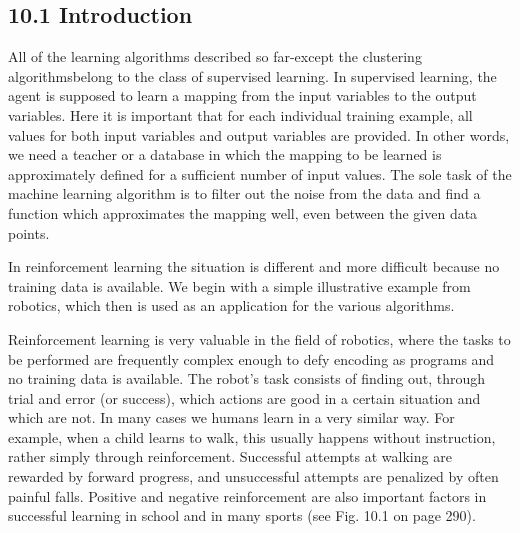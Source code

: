 \documentclass[10pt]{book}
\begin{document}
\begin{center}
\begin{enumerate}
\begin{center}
\begin{center}
\begin{center}
\subsection*{10.1 Introduction}
All of the learning algorithms described so far-except the clustering algorithmsbelong to the class of supervised learning. In supervised learning, the agent is supposed to learn a mapping from the input variables to the output variables. Here it is important that for each individual training example, all values for both input variables and output variables are provided. In other words, we need a teacher or a database in which the mapping to be learned is approximately defined for a sufficient number of input values. The sole task of the machine learning algorithm is to filter out the noise from the data and find a function which approximates the mapping well, even between the given data points.


In reinforcement learning the situation is different and more difficult because no training data is available. We begin with a simple illustrative example from robotics, which then is used as an application for the various algorithms.

Reinforcement learning is very valuable in the field of robotics, where the tasks to be performed are frequently complex enough to defy encoding as programs and no training data is available. The robot's task consists of finding out, through trial and error (or success), which actions are good in a certain situation and which are not. In many cases we humans learn in a very similar way. For example, when a child learns to walk, this usually happens without instruction, rather simply through reinforcement. Successful attempts at walking are rewarded by forward progress, and unsuccessful attempts are penalized by often painful falls. Positive and negative reinforcement are also important factors in successful learning in school and in many sports (see Fig. 10.1 on page 290).


\end{center}
\end{center}
\end{center}
\end{enumerate}
\end{center}
\end{document}
